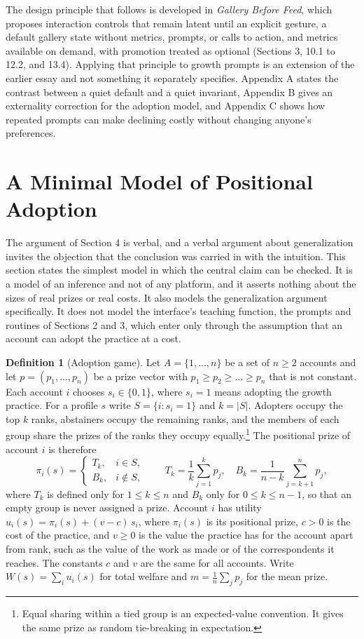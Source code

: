 \documentclass[12pt]{article}
\theoremstyle{plain}
\theoremstyle{definition}
\newtheorem{definition}{Definition}
\begin{document}
The design principle that follows is developed in \emph{Gallery Before Feed}, which proposes interaction controls that remain latent until an explicit gesture, a default gallery state without metrics, prompts, or calls to action, and metrics available on demand, with promotion treated as optional (Sections 3, 10.1 to 12.2, and 13.4). Applying that principle to growth prompts is an extension of the earlier essay and not something it separately specifies. Appendix A states the contrast between a quiet default and a quiet invariant, Appendix B gives an externality correction for the adoption model, and Appendix C shows how repeated prompts can make declining costly without changing anyone's preferences.

\section{A Minimal Model of Positional Adoption}

The argument of Section 4 is verbal, and a verbal argument about generalization invites the objection that the conclusion was carried in with the intuition. This section states the simplest model in which the central claim can be checked. It is a model of an inference and not of any platform, and it asserts nothing about the sizes of real prizes or real costs. It also models the generalization argument specifically. It does not model the interface's teaching function, the prompts and routines of Sections 2 and 3, which enter only through the assumption that an account can adopt the practice at a cost.

\begin{definition}[Adoption game]
Let $A=\{1,\dots,n\}$ be a set of $n\ge 2$ accounts and let $p=(p_1,\dots,p_n)$ be a prize vector with $p_1\ge p_2\ge\dots\ge p_n$ that is not constant. Each account $i$ chooses $s_i\in\{0,1\}$, where $s_i=1$ means adopting the growth practice. For a profile $s$ write $S=\{i : s_i=1\}$ and $k=|S|$. Adopters occupy the top $k$ ranks, abstainers occupy the remaining ranks, and the members of each group share the prizes of the ranks they occupy equally.\footnote{Equal sharing within a tied group is an expected-value convention. It gives the same prize as random tie-breaking in expectation.} The positional prize of account $i$ is therefore
\[
\pi_i(s)=
\begin{cases}
T_k,& i\in S,\\
B_k,& i\notin S,
\end{cases}
\qquad
T_k=\frac1k\sum_{j=1}^{k}p_j,\quad B_k=\frac1{n-k}\sum_{j=k+1}^{n}p_j ,
\]
where $T_k$ is defined only for $1\le k\le n$ and $B_k$ only for $0\le k\le n-1$, so that an empty group is never assigned a prize.
Account $i$ has utility $u_i(s)=\pi_i(s)+(v-c)\,s_i$, where $\pi_i(s)$ is its positional prize, $c>0$ is the cost of the practice, and $v\ge 0$ is the value the practice has for the account apart from rank, such as the value of the work as made or of the correspondents it reaches. The constants $c$ and $v$ are the same for all accounts. Write $W(s)=\sum_i u_i(s)$ for total welfare and $m=\frac1n\sum_j p_j$ for the mean prize.
\end{definition}
\end{document}
